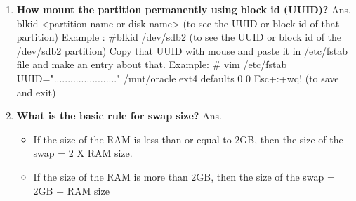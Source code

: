 \begin{enumerate}
\begin{enumerate}
  \bigskip
  \bigskip

  \item \textbf{How mount the partition permanently using block id (UUID)?}
  \newline
  Ans. blkid   <partition name or disk name>       (to see the UUID or block id of that partition)
	 Example :  #blkid   /dev/sdb2       (to see the UUID or block id of the /dev/sdb2 partition)
	 Copy that UUID with mouse and paste it in /etc/fstab file and make an entry about that.
	 Example:  # vim /etc/fstab
	 UUID="{.......................}"  	/mnt/oracle	ext4	defaults	0	0
	 Esc+:+wq!      (to save and exit)

  \bigskip
  \bigskip

  \item \textbf{What is the basic rule for swap size?}
  \newline
  Ans.\begin{itemize}
         \item If the size of the RAM is less than or equal to 2GB, then the size of the swap = 2 X RAM size.
         \item If the size of the RAM is more than 2GB, then the size of the swap = 2GB + RAM size
      \end{itemize}
   
  \bigskip
  \bigskip


\end{enumerate}
\end{enumerate}
